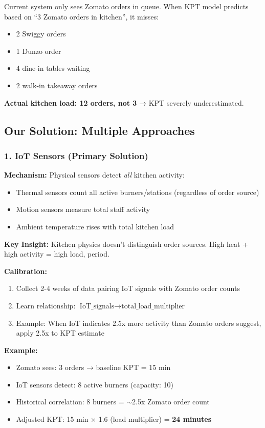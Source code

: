 \documentclass[11pt,a4paper]{article}
\begin{document}
Current system only sees Zomato orders in queue. When KPT model predicts based on ``3 Zomato orders in kitchen'', it misses:
\begin{itemize}
    \item 2 Swiggy orders
    \item 1 Dunzo order
    \item 4 dine-in tables waiting
    \item 2 walk-in takeaway orders
\end{itemize}

\textbf{Actual kitchen load: 12 orders, not 3} → KPT severely underestimated.

\subsection{Our Solution: Multiple Approaches}

\subsubsection{1. IoT Sensors (Primary Solution)}

\textbf{Mechanism:} Physical sensors detect \textit{all} kitchen activity:
\begin{itemize}[leftmargin=*]
    \item Thermal sensors count all active burners/stations (regardless of order source)
    \item Motion sensors measure total staff activity
    \item Ambient temperature rises with total kitchen load
\end{itemize}

\textbf{Key Insight:} Kitchen physics doesn't distinguish order sources. High heat + high activity = high load, period.

\textbf{Calibration:}
\begin{enumerate}
    \item Collect 2-4 weeks of data pairing IoT signals with Zomato order counts
    \item Learn relationship: $\text{IoT\_signals} \rightarrow \text{total\_load\_multiplier}$
    \item Example: When IoT indicates 2.5x more activity than Zomato orders suggest, apply 2.5x to KPT estimate
\end{enumerate}

\textbf{Example:}
\begin{itemize}
    \item Zomato sees: 3 orders → baseline KPT = 15 min
    \item IoT sensors detect: 8 active burners (capacity: 10)
    \item Historical correlation: 8 burners = $\sim$2.5x Zomato order count
    \item Adjusted KPT: 15 min × 1.6 (load multiplier) = \textbf{24 minutes}
\end{itemize}
\end{document}

